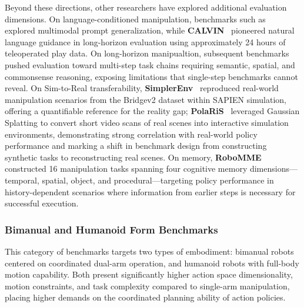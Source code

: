 Beyond these directions, other researchers have explored additional evaluation dimensions. On language-conditioned manipulation, benchmarks such as~\cite{VIMA-Bench, zheng2022vlmbench} explored multimodal prompt generalization, while \textbf{CALVIN}~\cite{mees2022calvin} pioneered natural language guidance in long-horizon evaluation using approximately 24 hours of teleoperated play data. On long-horizon manipualtion, subsequent benchmarks~\cite{gao2025genmanip, zhang2024vlabench} pushed evaluation toward multi-step task chains requiring semantic, spatial, and commonsense reasoning, exposing limitations that single-step benchmarks cannot reveal. On Sim-to-Real transferability, \textbf{SimplerEnv}~\cite{li2024simplerenv} reproduced real-world manipulation scenarios from the Bridgev2 dataset within SAPIEN simulation, offering a quantifiable reference for the reality gap; \textbf{PolaRiS}~\cite{jain2025polaris} leveraged Gaussian Splatting to convert short video scans of real scenes into interactive simulation environments, demonstrating strong correlation with real-world policy performance and marking a shift in benchmark design from constructing synthetic tasks to reconstructing real scenes.  On memory, \textbf{RoboMME}~\cite{dai2026robomme} constructed 16 manipulation tasks spanning four cognitive memory dimensions—temporal, spatial, object, and procedural—targeting policy performance in history-dependent scenarios where information from earlier steps is necessary for successful execution.




\subsubsection{Bimanual and Humanoid Form Benchmarks}
\label{sec:bench_bimanual}

This category of benchmarks targets two types of embodiment: bimanual robots centered on
coordinated dual-arm operation, and humanoid robots with full-body motion capability. Both
present significantly higher action space dimensionality, motion constraints, and task
complexity compared to single-arm manipulation, placing higher demands on the coordinated
planning ability of action policies.

